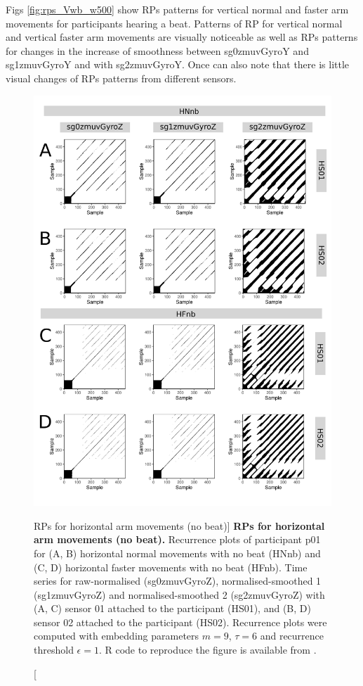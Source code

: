 Figs \ref{fig:rps_Vwb_w500} show RPs patterns for vertical normal and 
faster arm movements for participants hearing a beat. 
Patterns of RP for vertical normal and vertical faster arm movements are 
visually noticeable as well as RPs patterns for changes in 
the increase of smoothness between sg0zmuvGyroY and sg1zmuvGyroY and 
with sg2zmuvGyroY. Once can also note that there is little visual 
changes of RPs patterns from different sensors.
\begin{figure}
\centering
\includegraphics[height=0.8\textheight]{rps_Hnb_w500}
\caption
	[RPs for horizontal arm movements (no beat)]{
	{\bf RPs for horizontal arm movements (no beat).}	
	Recurrence plots of participant p01 for 
	(A, B) horizontal normal movements with no beat (HNnb) and
	(C, D) horizontal faster movements with no beat (HFnb).
	Time series for raw-normalised (sg0zmuvGyroZ), 
	normalised-smoothed 1 (sg1zmuvGyroZ) and 
	normalised-smoothed 2 (sg2zmuvGyroZ) with
	(A, C) sensor 01 attached to the participant (HS01), and
	(B, D) sensor 02 attached to the participant (HS02).
	Recurrence plots were computed with 
	embedding parameters $m=9$, $\tau=6$ and 
	recurrence threshold $\epsilon=1$.
	R code to reproduce the figure is available from \cite{hwum2018}.
        }
    \label{fig:rps_Hnb_w500}
\end{figure}
